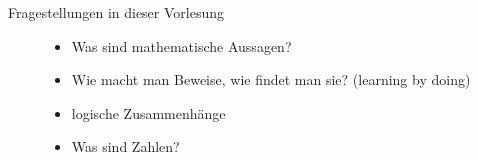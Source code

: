 \documentclass[../ana1.tex]{subfiles}
\begin{document}
\begin{prosa}
\begin{description}
	\item[Fragestellungen in dieser Vorlesung]\leavevmode
		\begin{itemize}[-]
			\item Was sind mathematische Aussagen?
			\item Wie macht man Beweise, wie findet man sie? (learning by doing)
			\item logische Zusammenhänge
			\item Was sind Zahlen?
		\end{itemize} 
\end{description}

\end{prosa}
\end{document}
